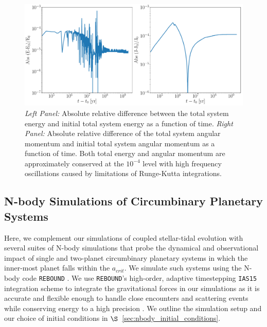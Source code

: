 \begin{figure}
	\includegraphics[width=\textwidth]{conservation.pdf}
    \caption{{\it Left Panel:} Absolute relative difference between the total system energy and initial total system energy as a function of time.  {\it Right Panel:} Absolute relative difference of the total system angular momentum and initial total system angular momentum as a function of time.  Both total energy and angular momentum are approximately conserved at the $10^{-4}$ level with high frequency oscillations caused by limitations of Runge-Kutta integrations.}
    \label{fig:conservation}
\end{figure}


\subsection{N-body Simulations of Circumbinary Planetary Systems} \label{sec:nbody_methods}

Here, we complement our \vplanet simulations of coupled stellar-tidal evolution with several suites of N-body simulations that probe the dynamical and observational impact of single and two-planet circumbinary planetary systems in which the inner-most planet falls within the $a_{crit}$.  We simulate such systems using the N-body code \texttt{REBOUND} \citep{Rein2012}.  We use \texttt{REBOUND}'s high-order, adaptive timestepping \texttt{IAS15} integration scheme to integrate the gravitational forces in our simulations as it is accurate and flexible enough to handle close encounters and scattering events while conserving energy to a high precision \citep{Rein2015}.  We outline the simulation setup and our choice of initial conditions in $\S$~\ref{sec:nbody_initial_conditions}.

